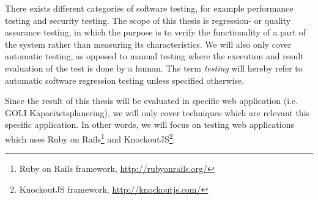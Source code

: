 There exists different categories of software testing, for example
performance testing and security testing. The scope of this thesis is
regression- or quality assurance testing\footnotemark, in which the
purpose is to verify the functionality of a part of the system rather
than measuring its characteristics. We will also only cover automatic
testing, as opposed to manual testing where the execution and result
evaluation of the test is done by a human. The term \emph{testing} will
hereby refer to automatic software regression testing unless specified
otherwise.\\


Since the result of this thesis will be evaluated in specific web
application (i.e. GOLI Kapacitetsplanering), we will only cover
techniques which are relevant this specific application. In other words,
we will focus on testing web applications which uses Ruby on
Rails\footnote{Ruby on Rails framework, \url{http://rubyonrails.org/}}
and KnockoutJS\footnote{KnockoutJS framework,
\url{http://knockoutjs.com/}}.\\

